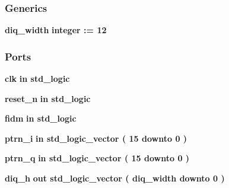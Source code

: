 \subsubsection*{Generics}
 \begin{DoxyCompactItemize}
\item 
{\bf diq\+\_\+width} {\bfseries {\bfseries \textcolor{comment}{integer}\textcolor{vhdlchar}{ }\textcolor{vhdlchar}{ }\textcolor{vhdlchar}{\+:}\textcolor{vhdlchar}{=}\textcolor{vhdlchar}{ }\textcolor{vhdlchar}{ } \textcolor{vhdldigit}{12} \textcolor{vhdlchar}{ }}}
\end{DoxyCompactItemize}
\subsubsection*{Ports}
 \begin{DoxyCompactItemize}
\item 
{\bf clk}  {\bfseries {\bfseries \textcolor{keywordflow}{in}\textcolor{vhdlchar}{ }}} {\bfseries \textcolor{comment}{std\+\_\+logic}\textcolor{vhdlchar}{ }} 
\item 
{\bf reset\+\_\+n}  {\bfseries {\bfseries \textcolor{keywordflow}{in}\textcolor{vhdlchar}{ }}} {\bfseries \textcolor{comment}{std\+\_\+logic}\textcolor{vhdlchar}{ }} 
\item 
{\bf fidm}  {\bfseries {\bfseries \textcolor{keywordflow}{in}\textcolor{vhdlchar}{ }}} {\bfseries \textcolor{comment}{std\+\_\+logic}\textcolor{vhdlchar}{ }} 
\item 
{\bf ptrn\+\_\+i}  {\bfseries {\bfseries \textcolor{keywordflow}{in}\textcolor{vhdlchar}{ }}} {\bfseries \textcolor{comment}{std\+\_\+logic\+\_\+vector}\textcolor{vhdlchar}{ }\textcolor{vhdlchar}{(}\textcolor{vhdlchar}{ }\textcolor{vhdlchar}{ } \textcolor{vhdldigit}{15} \textcolor{vhdlchar}{ }\textcolor{keywordflow}{downto}\textcolor{vhdlchar}{ }\textcolor{vhdlchar}{ } \textcolor{vhdldigit}{0} \textcolor{vhdlchar}{ }\textcolor{vhdlchar}{)}\textcolor{vhdlchar}{ }} 
\item 
{\bf ptrn\+\_\+q}  {\bfseries {\bfseries \textcolor{keywordflow}{in}\textcolor{vhdlchar}{ }}} {\bfseries \textcolor{comment}{std\+\_\+logic\+\_\+vector}\textcolor{vhdlchar}{ }\textcolor{vhdlchar}{(}\textcolor{vhdlchar}{ }\textcolor{vhdlchar}{ } \textcolor{vhdldigit}{15} \textcolor{vhdlchar}{ }\textcolor{keywordflow}{downto}\textcolor{vhdlchar}{ }\textcolor{vhdlchar}{ } \textcolor{vhdldigit}{0} \textcolor{vhdlchar}{ }\textcolor{vhdlchar}{)}\textcolor{vhdlchar}{ }} 
\item 
{\bf diq\+\_\+h}  {\bfseries {\bfseries \textcolor{keywordflow}{out}\textcolor{vhdlchar}{ }}} {\bfseries \textcolor{comment}{std\+\_\+logic\+\_\+vector}\textcolor{vhdlchar}{ }\textcolor{vhdlchar}{(}\textcolor{vhdlchar}{ }\textcolor{vhdlchar}{ }\textcolor{vhdlchar}{ }\textcolor{vhdlchar}{ }{\bfseries {\bf diq\+\_\+width}} \textcolor{vhdlchar}{ }\textcolor{keywordflow}{downto}\textcolor{vhdlchar}{ }\textcolor{vhdlchar}{ } \textcolor{vhdldigit}{0} \textcolor{vhdlchar}{ }\textcolor{vhdlchar}{)}\textcolor{vhdlchar}{ }} 

\end{DoxyCompactItemize}
